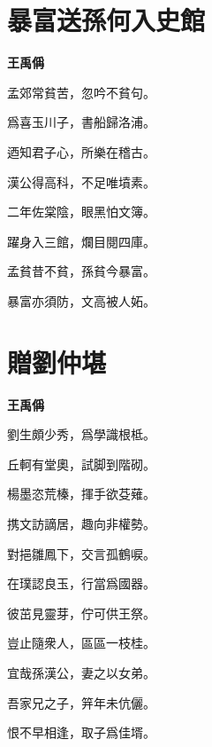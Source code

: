 \documentclass[12pt,a4paper]{ctexbook}
\begin{document}
\section{暴富送孫何入史館}
\textbf{王禹偁}\par\vspace{0.5em}
孟郊常貧苦，忽吟不貧句。\par
爲喜玉川子，書船歸洛浦。\par
迺知君子心，所樂在稽古。\par
漢公得高科，不足唯墳素。\par
二年佐棠陰，眼黑怕文簿。\par
躍身入三館，爛目閱四庫。\par
孟貧昔不貧，孫貧今暴富。\par
暴富亦須防，文高被人妬。\par

\section{贈劉仲堪}
\textbf{王禹偁}\par\vspace{0.5em}
劉生頗少秀，爲學識根柢。\par
丘軻有堂奧，試脚到階砌。\par
楊墨恣荒榛，揮手欲芟薙。\par
携文訪謫居，趣向非權勢。\par
對挹雛鳳下，交言孤鶴唳。\par
在璞認良玉，行當爲國器。\par
彼茁見靈芽，佇可供王祭。\par
豈止隨衆人，區區一枝桂。\par
宜哉孫漢公，妻之以女弟。\par
吾家兄之子，笄年未伉儷。\par
恨不早相逢，取子爲佳壻。\par
\end{document}
